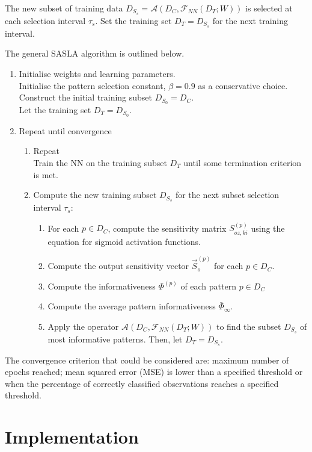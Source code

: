 \documentclass[conference]{IEEEtran}
\begin{document}
	The new subset of training data $D_{S_s} = 	\mathcal{A}(D_C, \mathcal{F}_{NN}(D_T;W))$ is selected at each selection interval $\tau_s$. Set the training set $D_T=D_{S_s}$ for the next training interval. 
	
	The general SASLA algorithm is outlined below.
	\begin{enumerate}
		\item Initialise weights and learning parameters. \\
		Initialise the pattern selection constant, $\beta=0.9$ as a conservative choice. \\
		Construct the initial training subset $D_{S_0} = D_C$. \\
		Let the training set $D_T=D_{S_0}$.\\
		\item Repeat until convergence
		\begin{enumerate}
		\item Repeat \\
		Train the NN on the training subset $D_T$ until some termination criterion is met.
		\item Compute the new training subset $D_{S_s}$ for the next subset selection interval $\tau_s$:
		\begin{enumerate}
		\item For each $p\in D_C$, compute the sensitivity matrix $S_{oz,ki}^{(p)}$ using the equation for sigmoid activation functions.
		\item Compute the output sensitivity vector $\vec{S}_o^{(p)}$ for each $p\in D_C$.
		\item Compute the informativeness $\Phi^{(p)}$ of each pattern $p\in D_C$
		\item Compute the average pattern informativeness $\bar{\Phi}_\infty$.
		\item Apply the operator $\mathcal{A}(D_C, \mathcal{F}_{NN}(D_T;W))$ to find the subset $D_{S_s}$ of most informative patterns. Then, let $D_T=D_{S_s}$.
		\end{enumerate}
		\end{enumerate}
	\end{enumerate}
	The convergence criterion that could be considered are: maximum number of epochs reached; mean squared error (MSE) is lower than a specified threshold or when the percentage of correctly classified observations reaches a specified threshold.
	
	\section{Implementation}\label{I}
	
\end{document}
